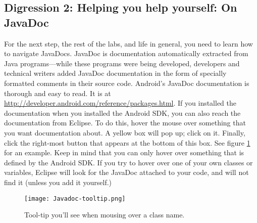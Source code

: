 \documentclass[10pt]{article}
\begin{document}
\subsection{Digression 2: Helping you help yourself: On JavaDoc} For the next step, the rest of the labs, and life in general, you need to learn how to navigate JavaDocs. JavaDoc is documentation automatically extracted from Java programs---while these programs were being developed, developers and technical writers added JavaDoc documentation in the form of specially formatted comments in their source code.
Android's JavaDoc documentation is thorough and easy to read. It is at \url{http://developer.android.com/reference/packages.html}. If you installed the documentation when you installed the Android SDK, you can also reach the documentation from Eclipse. To do this, hover the mouse over something that you want documentation about. A yellow box will pop up; click on it. Finally, click the right-most button that appears at the bottom of this box. See figure \ref{fig:javadoc-tooltip} for an example. Keep in mind that you can only hover over something that is defined by the Android SDK. If you try to hover over one of your own classes or variables, Eclipse will look for the JavaDoc attached to your code, and will not find it (unless you add it yourself.)
\begin{figure}[ht]
\texttt{[image: Javadoc-tooltip.png]}
\caption{\label{fig:javadoc-tooltip}Tool-tip you'll see when mousing over a class name.}
\end{figure}
\end{document}
